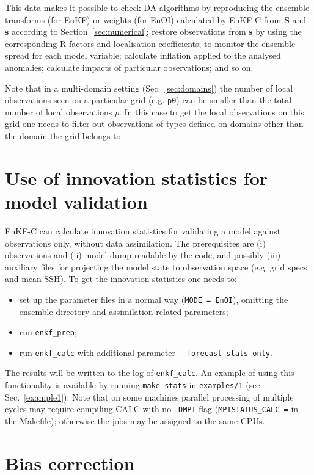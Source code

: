 \documentclass[11pt]{report}
\newcommand{\mb} {\mathbf}
\begin{document}
This data makes it possible to check DA algorithms by reproducing the ensemble transforms (for EnKF) or weights (for EnOI) calculated by EnKF-C from $\mb S$ and $\mb s$ according to Section~\ref{sec:numerical}; restore observations from $\mb s$ by using the corresponding R-factors and localisation coefficients; to monitor the ensemble spread for each model variable; calculate inflation applied to the analysed anomalies; calculate impacts of particular observations; and so on.

Note that in a multi-domain setting (Sec.~\ref{sec:domains}) the number of local observations seen on a particular grid (e.g. \verb|p0|) can be smaller than the total number of local observations $p$.
In this case to get the local observations on this grid one needs to filter out observations of types defined on domains other than the domain the grid belongs to.

\section{Use of innovation statistics for model validation}

EnKF-C can calculate innovation statistics for validating a model against observations only, without data assimilation.
The prerequisites are (i) observations and (ii) model dump readable by the code, and possibly (iii) auxiliary files for projecting the model state to observation space (e.g. grid specs and mean SSH).
To get the innovation statistics one needs to:
\begin{itemize}
\item set up the parameter files in a normal way (\verb|MODE = EnOI|), omitting the ensemble directory and assimilation related parameters;
\item run \verb|enkf_prep|;
\item run \verb|enkf_calc| with additional parameter \verb|--forecast-stats-only|.
\end{itemize}
The results will be written to the log of \verb|enkf_calc|. 
An example of using this functionality is available by running \verb|make stats| in \verb|examples/1| (see Sec.~\ref{example1}).
Note that on some machines parallel processing of multiple cycles may require compiling CALC with no \verb|-DMPI| flag (\verb|MPISTATUS_CALC =| in the Makefile); otherwise the jobs may be assigned to the same CPUs.

\section{Bias correction}
\label{sec:bias}
\end{document}
